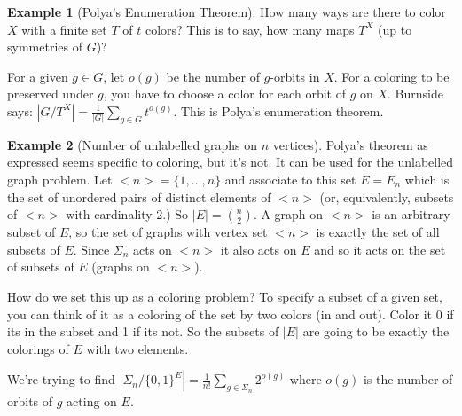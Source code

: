 \documentclass[12pt]{article}
\theoremstyle{definition}
\newtheorem{exmp}{Example}[section]
\begin{document}
\begin{exmp}[Polya's Enumeration Theorem]
    How many ways are there to color $X$ with a finite set $T$ of $t$ colors?
    This is to say, how many maps $T^X$ (up to symmetries of $G$)?

    For a given $g \in G$, let $o(g)$ be the number of $g$-orbits in $X$. For a
    coloring to be preserved under $g$, you have to choose a color for each
    orbit of $g$ on $X$. Burnside says: $|G/T^X| = \frac{1}{|G|} \sum_{g \in G}
    t^{o(g)}$. This is Polya's enumeration theorem.
\end{exmp}

\begin{exmp}[Number of unlabelled graphs on $n$ vertices]
    Polya's theorem as expressed seems specific to coloring, but it's not. It
    can be used for the unlabelled graph problem. Let $<n> = \{1, \ldots, n\}$
    and associate to this set $E = E_n$ which is the set of unordered pairs of
    distinct elements of $<n>$ (or, equivalently, subsets of $<n>$ with
    cardinality 2.) So $|E| = {n \choose 2}$. A graph on $<n>$ is an arbitrary
    subset of $E$, so the set of graphs with vertex set $<n>$ is exactly the
    set of all subsets of $E$.  Since $\Sigma_n$ acts on $<n>$ it also acts on
    $E$ and so it acts on the set of subsets of $E$ (graphs on $<n>$).

    How do we set this up as a coloring problem? To specify a subset of a given
    set, you can think of it as a coloring of the set by two colors (in and
    out).  Color it 0 if its in the subset and 1 if its not. So the subsets of
    $|E|$ are going to be exactly the colorings of $E$ with two elements. 
    
    We're trying to find $|\Sigma_n / \{0, 1\}^E| = \frac{1}{n!} \sum_{g \in
    \Sigma_n} 2^{o(g)}$ where $o(g)$ is the number of orbits of $g$ acting on
    $E$.
\end{exmp}
\end{document}
